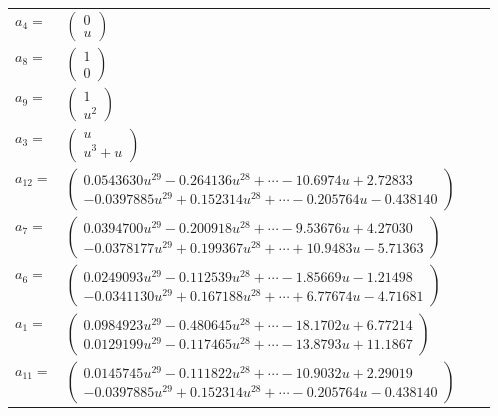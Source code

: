 \documentclass[1p]{elsarticle_modified}
\theoremstyle{definition}
\begin{document}
\begin{tabular}{m{7pt} m{180pt} m{7pt} m{180pt} }
\flushright $a_{4}=$&$\begin{pmatrix}0\\u\end{pmatrix}$ \\
\flushright $a_{8}=$&$\begin{pmatrix}1\\0\end{pmatrix}$ \\
\flushright $a_{9}=$&$\begin{pmatrix}1\\u^2\end{pmatrix}$ \\
\flushright $a_{3}=$&$\begin{pmatrix}u\\u^3+u\end{pmatrix}$ \\
\flushright $a_{12}=$&$\begin{pmatrix}0.0543630 u^{29}-0.264136 u^{28}+\cdots-10.6974 u+2.72833\\-0.0397885 u^{29}+0.152314 u^{28}+\cdots-0.205764 u-0.438140\end{pmatrix}$ \\
\flushright $a_{7}=$&$\begin{pmatrix}0.0394700 u^{29}-0.200918 u^{28}+\cdots-9.53676 u+4.27030\\-0.0378177 u^{29}+0.199367 u^{28}+\cdots+10.9483 u-5.71363\end{pmatrix}$ \\
\flushright $a_{6}=$&$\begin{pmatrix}0.0249093 u^{29}-0.112539 u^{28}+\cdots-1.85669 u-1.21498\\-0.0341130 u^{29}+0.167188 u^{28}+\cdots+6.77674 u-4.71681\end{pmatrix}$ \\
\flushright $a_{1}=$&$\begin{pmatrix}0.0984923 u^{29}-0.480645 u^{28}+\cdots-18.1702 u+6.77214\\0.0129199 u^{29}-0.117465 u^{28}+\cdots-13.8793 u+11.1867\end{pmatrix}$ \\
\flushright $a_{11}=$&$\begin{pmatrix}0.0145745 u^{29}-0.111822 u^{28}+\cdots-10.9032 u+2.29019\\-0.0397885 u^{29}+0.152314 u^{28}+\cdots-0.205764 u-0.438140\end{pmatrix}$ \\

\end{tabular}
\end{document}
